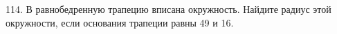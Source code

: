 114. В равнобедренную трапецию вписана окружность. Найдите радиус этой окружности, если основания трапеции равны 49 и 16.\\
